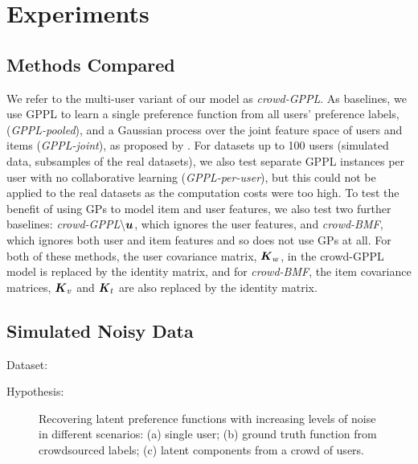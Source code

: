\section{Experiments}\label{sec:expts}


\subsection{Methods Compared}

We refer to the multi-user variant of our model as \emph{crowd-GPPL}.
As baselines, we use GPPL to learn a single preference function from all users' preference labels, (\emph{GPPL-pooled}), and a Gaussian process over the joint feature space of users and items 
(\emph{GPPL-joint}), as proposed by \citet{guo2010gaussian}.
For datasets up to 100 users (simulated data, subsamples of the real datasets), 
we also test separate GPPL instances per user with no collaborative
learning (\emph{GPPL-per-user}), but this could not be applied to the real datasets as the 
computation costs were too high.
To test the benefit of using GPs to model item and user features,
we also test two further baselines: 
\emph{crowd-GPPL$\mathbf{\setminus \boldsymbol u}$}, which ignores the user features,
and \emph{crowd-BMF}, which ignores both user and item features and so does not use GPs at all. 
For both of these methods, the user covariance matrix, $\boldsymbol K_w$, in the crowd-GPPL model is replaced by the identity matrix, and for \emph{crowd-BMF}, the item covariance matrices, $\boldsymbol K_v$ and $\boldsymbol K_t$ are also replaced by the identity matrix.



\subsection{Simulated Noisy Data}\label{sec:exp_synth}

Dataset:

Hypothesis: 

\begin{figure}
\caption{Recovering latent preference functions with increasing levels of noise
in different scenarios: 
(a) single user; 
(b) ground truth function from crowdsourced labels; 
(c) latent components from a crowd of users.
}
\end{figure}

